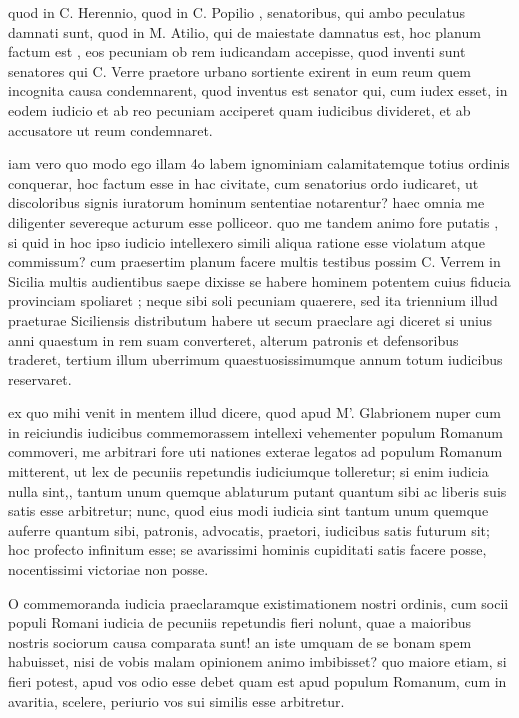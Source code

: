  quod in C. Herennio, quod in C. Popilio , senatoribus, qui ambo peculatus damnati sunt, quod in M. Atilio, qui de maiestate damnatus est, hoc planum factum est , eos pecuniam ob rem iudicandam accepisse, quod inventi sunt senatores qui C. Verre praetore urbano sortiente exirent in eum reum quem incognita causa condemnarent, quod inventus est senator qui, cum iudex esset, in eodem iudicio et ab reo pecuniam acciperet quam iudicibus divideret, et ab accusatore ut reum condemnaret.

 iam vero quo modo ego illam 4o labem ignominiam calamitatemque totius ordinis conquerar, hoc factum esse in hac civitate, cum senatorius ordo iudicaret, ut discoloribus signis iuratorum hominum sententiae notarentur? haec omnia me diligenter severeque acturum esse polliceor. quo me tandem animo fore putatis , si quid in hoc ipso iudicio intellexero simili aliqua ratione esse violatum atque commissum? cum praesertim planum facere multis testibus possim C. Verrem in Sicilia multis audientibus saepe dixisse se habere hominem potentem cuius fiducia provinciam spoliaret ; neque sibi soli pecuniam quaerere, sed ita triennium illud praeturae Siciliensis distributum habere ut secum praeclare agi diceret si unius anni quaestum in rem suam converteret, alterum patronis et defensoribus traderet, tertium illum uberrimum quaestuosissimumque annum totum iudicibus reservaret.

 ex quo mihi venit in mentem illud dicere, quod apud M'. Glabrionem nuper cum in reiciundis iudicibus commemorassem intellexi vehementer populum Romanum commoveri, me arbitrari fore uti nationes exterae legatos ad populum Romanum mitterent, ut lex de pecuniis repetundis iudiciumque tolleretur; si enim iudicia nulla sint,, tantum unum quemque ablaturum putant quantum sibi ac liberis suis satis esse arbitretur; nunc, quod eius modi iudicia sint tantum unum quemque auferre quantum sibi, patronis, advocatis, praetori, iudicibus satis futurum sit; hoc profecto infinitum esse; se avarissimi hominis cupiditati satis facere posse, nocentissimi victoriae non posse.

 O commemoranda iudicia praeclaramque existimationem nostri ordinis, cum socii populi Romani iudicia de pecuniis repetundis fieri nolunt, quae a maioribus nostris sociorum causa comparata sunt! an iste umquam de se bonam spem habuisset, nisi de vobis malam opinionem animo imbibisset? quo maiore etiam, si fieri potest, apud vos odio esse debet quam est apud populum Romanum, cum in avaritia, scelere, periurio vos sui similis esse arbitretur.

